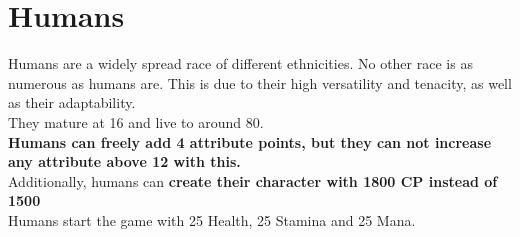 \section{Humans}\label{race:human}
Humans are a widely spread race of different ethnicities.
No other race is as numerous as humans are.
This is due to their high versatility and tenacity, as well as their adaptability.\\
They mature at 16 and live to around 80.\\
\textbf{Humans can freely add 4 attribute points, but they can not increase any attribute above 12 with this.}\\
Additionally, humans can \textbf{create their character with 1800 CP instead of 1500}\\
Humans start the game with 25 Health, 25 Stamina and 25 Mana.